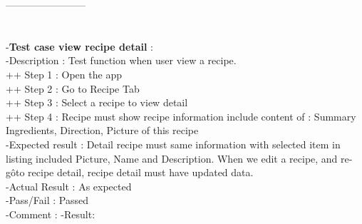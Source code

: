 \documentclass{article}
\begin{document}
    ------------------------\\ \\ \\
    -\textbf{Test case view recipe detail }: \\
    -Description : Test function when user view a recipe. \\
    ++ Step 1 : Open the app  \\
    ++ Step 2 : Go to Recipe Tab \\
    ++ Step 3 : Select a recipe to view detail  \\
    ++ Step 4 : Recipe must show recipe information include content of : Summary Ingredients, Direction, Picture of this recipe\\
    -Expected result : Detail recipe must same information with selected item in listing included Picture, Name and Description. When we edit a recipe, and re-gôto recipe detail, recipe detail must have updated data. \\
    -Actual Result : As expected \\
    -Pass/Fail : Passed \\
    -Comment : 
    -Result:
\end{document}
